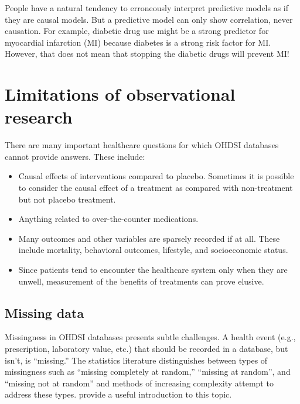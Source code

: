 \documentclass[11pt]{book}
\providecommand{\tightlist}{%
  \setlength{\itemsep}{0pt}\setlength{\parskip}{0pt}}
\theoremstyle{definition}
\theoremstyle{definition}
\theoremstyle{definition}
\theoremstyle{remark}
\let\BeginKnitrBlock\begin \let\EndKnitrBlock\end
\begin{document}
\BeginKnitrBlock{rmdimportant}
People have a natural tendency to erroneously interpret predictive models as if they are causal models. But a predictive model can only show correlation, never causation. For example, diabetic drug use might be a strong predictor for myocardial infarction (MI) because diabetes is a strong risk factor for MI. However, that does not mean that stopping the diabetic drugs will prevent MI!
\EndKnitrBlock{rmdimportant}

\hypertarget{limitations-of-observational-research}{%
\section{Limitations of observational research}\label{limitations-of-observational-research}}

There are many important healthcare questions for which OHDSI databases cannot provide answers. These include:

\begin{itemize}
\tightlist
\item
  Causal effects of interventions compared to placebo. Sometimes it is possible to consider the causal effect of a treatment as compared with non-treatment but not placebo treatment.
\item
  Anything related to over-the-counter medications.
\item
  Many outcomes and other variables are sparsely recorded if at all. These include mortality, behavioral outcomes, lifestyle, and socioeconomic status.
\item
  Since patients tend to encounter the healthcare system only when they are unwell, measurement of the benefits of treatments can prove elusive.
\end{itemize}

\hypertarget{missing-data}{%
\subsection{Missing data}\label{missing-data}}

Missingness in OHDSI databases presents subtle challenges. A health event (e.g., prescription, laboratory value, etc.) that should be recorded in a database, but isn't, is ``missing.'' The statistics literature distinguishes between types of missingness such as ``missing completely at random,'' ``missing at random'', and ``missing not at random'' and methods of increasing complexity attempt to address these types. \citet{perkins2017principled} provide a useful introduction to this topic.
\end{document}
